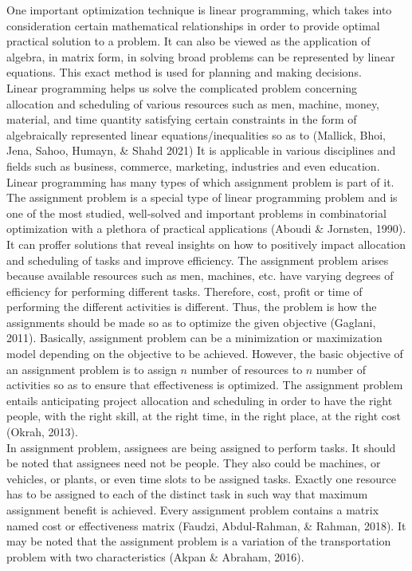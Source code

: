 \documentclass[11pt]{report}
\newcommand{\NI}{\noindent}
\begin{document}
	\NI One important optimization technique is linear programming, which takes into consideration certain mathematical relationships in order to provide optimal practical solution to a problem. It can also be viewed as the application of algebra, in matrix form, in solving broad problems can be represented by linear equations. This exact method is used for planning and making decisions.\\
	
	\NI Linear programming helps us solve the complicated problem concerning allocation and scheduling of various resources such as men, machine, money, material, and time quantity satisfying certain constraints in the form of algebraically represented linear equations/inequalities so as to (Mallick, Bhoi, Jena, Sahoo, Humayn, \& Shahd 2021) It is applicable in various disciplines and fields such as business, commerce, marketing, industries and even education. Linear programming has many types of which assignment problem is part of it.\\
	
	\NI The assignment problem is a special type of linear programming problem and is one of the most studied, well-solved and important problems in combinatorial optimization with a plethora of practical applications (Aboudi \& Jornsten, 1990). It can proffer solutions that reveal insights on how to positively impact allocation and scheduling of tasks and improve efficiency. The assignment problem arises because available resources such as men, machines, etc. have varying degrees of efficiency for performing different tasks. Therefore, cost, profit or time of performing the different activities is different. Thus, the problem is how the assignments should be made so as to optimize the given objective (Gaglani, 2011). Basically, assignment problem can be a minimization or maximization model depending on the objective to be achieved. However, the
	basic objective of an assignment problem is to assign $n$ number of resources to $n$ number of activities so as to ensure that effectiveness is optimized. The assignment problem entails anticipating project allocation and scheduling in order to have the right people, with the right skill, at the right time, in the right place, at the right cost (Okrah, 2013).\\
	
	\NI In assignment problem, assignees are being assigned to perform tasks. It should be noted that assignees need not be people. They also could be machines, or vehicles, or plants, or even time slots to be assigned tasks. Exactly one resource has to be assigned to each of the distinct task in
	such way that maximum assignment benefit is achieved. Every assignment problem contains a matrix named cost or effectiveness matrix (Faudzi, Abdul-Rahman, \& Rahman, 2018). It may be noted that the assignment problem is a variation of the transportation problem with two characteristics (Akpan \& Abraham, 2016).
	
\end{document}
